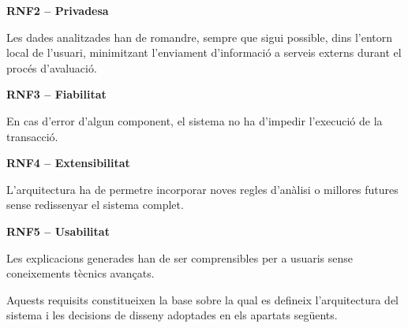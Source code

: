\textbf{RNF2 -- Privadesa}

Les dades analitzades han de romandre, sempre que sigui possible, dins l’entorn local de l’usuari, minimitzant l’enviament d’informació a serveis externs durant el procés d’avaluació.

\vspace{0.1cm}
\textbf{RNF3 -- Fiabilitat}

En cas d’error d’algun component, el sistema no ha d’impedir l’execució de la transacció.

\vspace{0.1cm}
\textbf{RNF4 -- Extensibilitat}

L’arquitectura ha de permetre incorporar noves regles d’anàlisi o millores futures sense redissenyar el sistema complet.

\textbf{RNF5 -- Usabilitat}

Les explicacions generades han de ser comprensibles per a usuaris sense coneixements tècnics avançats.

Aquests requisits constitueixen la base sobre la qual es defineix l’arquitectura del sistema i les decisions de disseny adoptades en els apartats següents.
